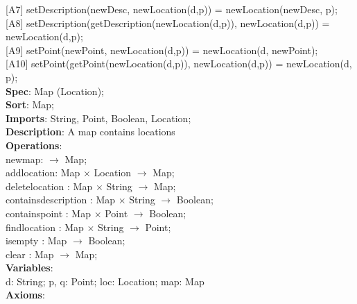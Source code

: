 \documentclass[12pt]{article}
\begin{document}
\begin{spacing}{1.5}
\hspace*{5mm} [A7] setDescription(newDesc, newLocation(d,p)) = newLocation(newDesc, p);\\
\hspace*{5mm} [A8] setDescription(getDescription(newLocation(d,p)), newLocation(d,p)) = newLocation(d,p);\\
\hspace*{5mm} [A9] setPoint(newPoint, newLocation(d,p)) = newLocation(d, newPoint);\\
\hspace*{5mm} [A10] setPoint(getPoint(newLocation(d,p)), newLocation(d,p)) = newLocation(d, p);\\

\noindent \textbf{Spec}: Map (Location);\\
\noindent \textbf{Sort}: Map;\\
\noindent \textbf{Imports}: String, Point, Boolean, Location;\\
\noindent \textbf{Description}: A map contains locations\\
\noindent \textbf{Operations}:\\
\hspace*{5mm} newmap: $\rightarrow$ Map;\\
\hspace*{5mm} addlocation: Map $\times$ Location $\rightarrow$ Map;\\
\hspace*{5mm} deletelocation : Map $\times$ String $\rightarrow$ Map;\\
\hspace*{5mm} containsdescription : Map $\times$ String $\rightarrow$ Boolean;\\
\hspace*{5mm} containspoint : Map $\times$ Point  $\rightarrow$ Boolean;\\
\hspace*{5mm} findlocation : Map $\times$ String  $\rightarrow$ Point;\\
\hspace*{5mm} isempty : Map $\rightarrow$ Boolean;\\
\hspace*{5mm} clear : Map $\rightarrow$ Map;\\
\noindent \textbf{Variables}:\\
\hspace*{5mm} d: String; p, q: Point; loc: Location; map: Map\\
\noindent \textbf{Axioms}:\\

\end{spacing}
\end{document}
